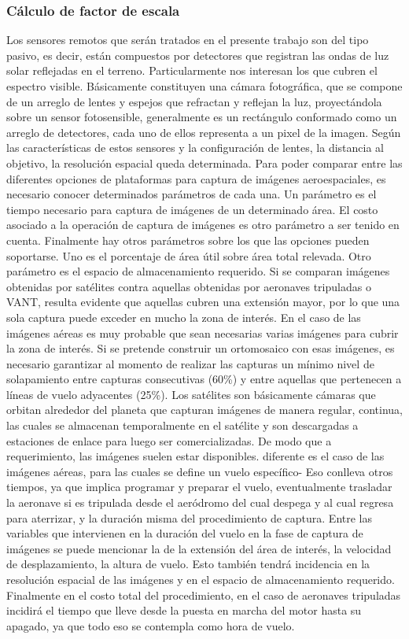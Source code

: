 \subsubsection{Cálculo de factor de escala}
Los sensores remotos que serán tratados en el presente trabajo son del tipo pasivo, es decir, están compuestos por detectores que registran las ondas de luz solar reflejadas en el terreno. Particularmente nos interesan los que cubren el espectro visible. Básicamente constituyen una cámara fotográfica, que se compone de un arreglo de lentes y espejos que refractan y reflejan la luz, proyectándola sobre un sensor fotosensible, generalmente es un rectángulo conformado como un arreglo de detectores, cada uno de ellos representa a un pixel de la imagen. Según las características de estos sensores y la configuración de lentes, la distancia al objetivo, la resolución espacial queda determinada. 
Para poder comparar entre las diferentes opciones de plataformas para captura de imágenes aeroespaciales, es necesario conocer determinados parámetros de cada una. Un parámetro es el tiempo necesario para captura de imágenes de un determinado área. El costo asociado a la operación de captura de imágenes es otro parámetro a ser tenido en cuenta. Finalmente hay otros parámetros sobre los que las opciones pueden soportarse. Uno es el porcentaje de área útil sobre área total relevada. Otro parámetro es el espacio de almacenamiento requerido.
Si se comparan imágenes obtenidas por satélites contra aquellas obtenidas por aeronaves tripuladas o VANT, resulta evidente que aquellas cubren una extensión mayor, por lo que una sola captura puede exceder en mucho la zona de interés. En el caso de las imágenes aéreas es muy probable que sean necesarias varias imágenes para cubrir la zona de interés. Si se pretende construir un ortomosaico con esas imágenes, es necesario garantizar al momento de realizar las capturas un mínimo nivel de solapamiento entre capturas consecutivas (60\%) y entre aquellas que pertenecen a líneas de vuelo adyacentes (25\%). Los satélites son básicamente cámaras que orbitan alrededor del planeta que capturan imágenes de manera regular, continua, las cuales se  almacenan temporalmente en el satélite y son descargadas a estaciones de enlace para luego ser comercializadas. De modo que a requerimiento, las imágenes suelen estar disponibles. diferente es el caso de las imágenes aéreas, para las cuales se define un vuelo específico- Eso conlleva otros tiempos, ya que implica programar y preparar el vuelo, eventualmente trasladar la aeronave si es tripulada desde el aeródromo del cual despega y al cual regresa para aterrizar, y la duración misma del procedimiento de captura. Entre las variables que intervienen en la duración del vuelo en la fase de captura de imágenes se puede mencionar la de la extensión del área de interés, la velocidad de desplazamiento, la altura de vuelo. Esto también tendrá incidencia en la resolución espacial de las imágenes y en el espacio de almacenamiento requerido. Finalmente en el costo total del procedimiento, en el caso de aeronaves tripuladas incidirá el tiempo que lleve desde la puesta en marcha del motor hasta su apagado, ya que todo eso se contempla como hora de vuelo.
